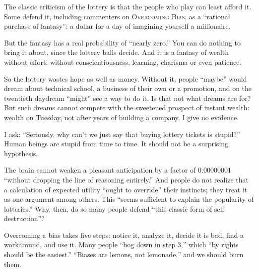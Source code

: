 
The classic criticism of the lottery is that the people who play can least afford it. Some defend it, including commenters on \textsc{Overcoming Bias}, as a ``rational purchase of fantasy'': a dollar for a day of imagining yourself a millionaire.

But the fantasy has a real probability of ``nearly zero.'' You can do nothing to bring it about, since the lottery balls decide. And it is a fantasy of wealth without effort: without conscientiousness, learning, charisma or even patience. 

So the lottery wastes hope as well as money. Without it, people ``maybe'' would dream about technical school, a business of their own or a promotion, and on the twentieth daydream ``might'' see a way to do it. Is that not what dreams are for? But such dreams cannot compete with the sweetened prospect of instant wealth: wealth on Tuesday, not after years of building a company. I give no evidence. 

I ask: ``Seriously, why can't we just say that buying lottery tickets is stupid?'' Human beings are stupid from time to time. It should not be a surprising hypothesis.

The brain cannot weaken a pleasant anticipation by a factor of 0.00000001 ``without dropping the line of reasoning entirely.''  And people do not realize that a calculation of expected utility ``ought to override'' their instincts; they treat it as one argument among others.  This ``seems sufficient to explain the popularity of lotteries.'' Why, then, do so many people defend ``this classic form of self-destruction''?

Overcoming a bias takes five steps: notice it, analyze it, decide it is bad, find a workaround, and use it. Many people ``bog down in step 3,'' which ``by rights should be the easiest.''  ``Biases are lemons, not lemonade,'' and we should burn them.
